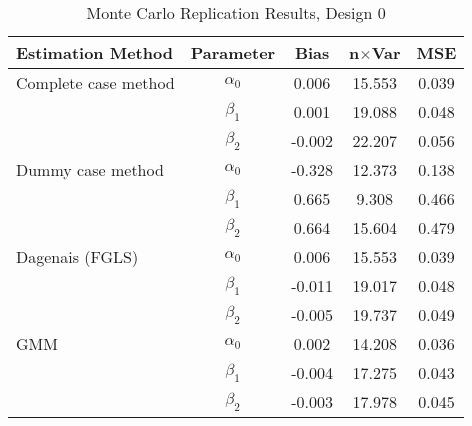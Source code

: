 \begin{table}
\centering
\caption{Monte Carlo Replication Results, Design 0}
\label{table:MCReplicationResultsDesign0}
\begin{tabular}{lcccc}
\toprule
Estimation Method & Parameter & Bias & n$\times$Var & MSE \\
\midrule
Complete case method & $\alpha_0$ & 0.006 & 15.553 & 0.039 \\
 & $\beta_1$ & 0.001 & 19.088 & 0.048 \\
 & $\beta_2$ & -0.002 & 22.207 & 0.056 \\
Dummy case method & $\alpha_0$ & -0.328 & 12.373 & 0.138 \\
 & $\beta_1$ & 0.665 & 9.308 & 0.466 \\
 & $\beta_2$ & 0.664 & 15.604 & 0.479 \\
Dagenais (FGLS) & $\alpha_0$ & 0.006 & 15.553 & 0.039 \\
 & $\beta_1$ & -0.011 & 19.017 & 0.048 \\
 & $\beta_2$ & -0.005 & 19.737 & 0.049 \\
GMM & $\alpha_0$ & 0.002 & 14.208 & 0.036 \\
 & $\beta_1$ & -0.004 & 17.275 & 0.043 \\
 & $\beta_2$ & -0.003 & 17.978 & 0.045 \\
\bottomrule
\end{tabular}
\end{table}
